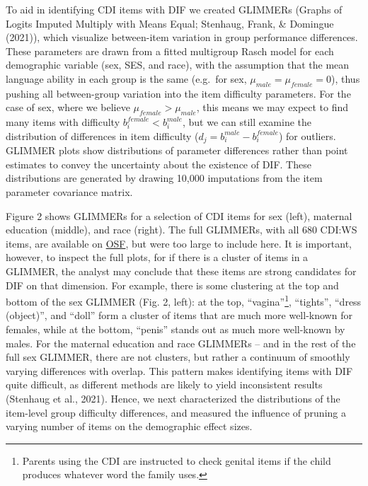 \documentclass[10pt, letterpaper]{article}
\begin{document}
To aid in identifying CDI items with DIF we created GLIMMERs (Graphs of
Logits Imputed Multiply with Means Equal; Stenhaug, Frank, \& Domingue
(2021)), which visualize between-item variation in group performance
differences. These parameters are drawn from a fitted multigroup Rasch
model for each demographic variable (sex, SES, and race), with the
assumption that the mean language ability in each group is the same
(e.g.~for sex, \(\mu_{male}=\mu_{female}=0\)), thus pushing all
between-group variation into the item difficulty parameters. For the
case of sex, where we believe \(\mu_{female}>\mu_{male}\), this means we
may expect to find many items with difficulty
\(b_i^{female} < b_i^{male}\), but we can still examine the distribution
of differences in item difficulty (\(d_j = b_i^{male} - b_i^{female}\))
for outliers. GLIMMER plots show distributions of parameter differences
rather than point estimates to convey the uncertainty about the
existence of DIF. These distributions are generated by drawing 10,000
imputations from the item parameter covariance matrix.

Figure 2 shows GLIMMERs for a selection of CDI items for sex (left),
maternal education (middle), and race (right). The full GLIMMERs, with
all 680 CDI:WS items, are available on
\href{https://osf.io/57rsw/?view_only=2b6ecb61fe08458293af7421d276932a}{OSF},
but were too large to include here. It is important, however, to inspect
the full plots, for if there is a cluster of items in a GLIMMER, the
analyst may conclude that these items are strong candidates for DIF on
that dimension. For example, there is some clustering at the top and
bottom of the sex GLIMMER (Fig. 2, left): at the top,
``vagina''\footnote{Parents using the CDI are instructed to check
  genital items if the child produces whatever word the family uses.},
``tights'', ``dress (object)'', and ``doll'' form a cluster of items
that are much more well-known for females, while at the bottom,
``penis'' stands out as much more well-known by males. For the maternal
education and race GLIMMERs -- and in the rest of the full sex GLIMMER,
there are not clusters, but rather a continuum of smoothly varying
differences with overlap. This pattern makes identifying items with DIF
quite difficult, as different methods are likely to yield inconsistent
results (Stenhaug et al., 2021). Hence, we next characterized the
distributions of the item-level group difficulty differences, and
measured the influence of pruning a varying number of items on the
demographic effect sizes.
\end{document}
